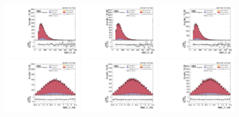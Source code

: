 \begin{figure}[!ht]
  \centering
  \includegraphics[width=0.30\textwidth]{analysis_plots/2016_zjj/cr_vjets_l/dijet_j1_pt.pdf}
  \includegraphics[width=0.30\textwidth]{analysis_plots/2017_zjj/cr_vjets_l/dijet_j1_pt.pdf}
  \includegraphics[width=0.30\textwidth]{analysis_plots/2018_zjj/cr_vjets_l/dijet_j1_pt.pdf} \\
  \includegraphics[width=0.30\textwidth]{analysis_plots/2016_zjj/cr_vjets_l/dijet_j1_eta.pdf}
  \includegraphics[width=0.30\textwidth]{analysis_plots/2017_zjj/cr_vjets_l/dijet_j1_eta.pdf}
  \includegraphics[width=0.30\textwidth]{analysis_plots/2018_zjj/cr_vjets_l/dijet_j1_eta.pdf} \\

\end{figure}
